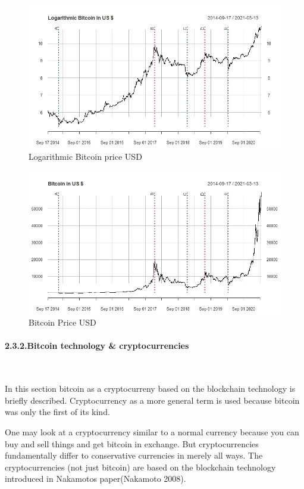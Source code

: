 \documentclass[
]{article}
\begin{document}
\begin{figure}
\includegraphics[width=0.8\linewidth]{images/logbtc_usd} \caption{Logarithmic Bitcoin price USD}\label{fig:logprice_btc}
\end{figure}

\begin{figure}
\includegraphics[width=0.8\linewidth]{images/btc_usd} \caption{Bitcoin Price USD}\label{fig:price_btc}
\end{figure}

\newpage

\hypertarget{bitcoin_tec}{%
\paragraph{2.3.2.Bitcoin technology \&
cryptocurrencies}\label{bitcoin_tec}}

~

In this section bitcoin as a cryptocurreny based on the blockchain
technology is briefly described. Cryptocurrency as a more general term
is used because bitcoin was only the first of its kind.

One may look at a cryptocurrency similar to a normal currency because
you can buy and sell things and get bitcoin in exchange. But
cryptocurrencies fundamentally differ to conservative currencies in
merely all ways. The cryptocurrencies (not just bitcoin) are based on
the blockchain technology introduced in Nakamotos paper(Nakamoto 2008).
\end{document}
